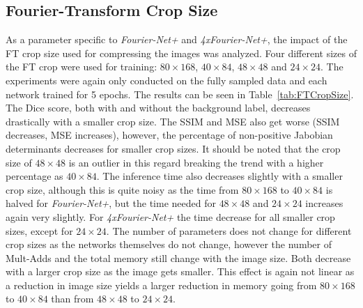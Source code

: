 \subsection{Fourier-Transform Crop Size} \label{SubSec:ResultsFTCropSize}
As a parameter specific to \emph{Fourier-Net+} and \emph{4xFourier-Net+}, the impact of the FT crop size used for compressing the images was analyzed. Four different sizes of the FT crop were used for training: $80 \times 168$, $40 \times 84$, $48 \times 48$ and $24 \times 24$. The experiments were again only conducted on the fully sampled data and each network trained for 5 epochs. The results can be seen in Table~\ref{tab:FTCropSize}. \\
The Dice score, both with and without the background label, decreases drastically with a smaller crop size. The SSIM and MSE also get worse (SSIM decreases, MSE increases), however, the percentage of non-positive Jabobian determinants decreases for smaller crop sizes. It should be noted that the crop size of $48 \times 48$ is an outlier in this regard breaking the trend with a higher percentage as $40 \times 84$. The inference time also decreases slightly with a smaller crop size, although this is quite noisy as the time from $80 \times 168$ to $40 \times 84$ is halved for \emph{Fourier-Net+}, but the time needed for $48 \times 48$ and $24 \times 24$ increases again very slightly. For \emph{4xFourier-Net+} the time decrease for all smaller crop sizes, except for $24 \times 24$. The number of parameters does not change for different crop sizes as the networks themselves do not change, however the number of Mult-Adds and the total memory still change with the image size. Both decrease with a larger crop size as the image gets smaller. This effect is again not linear as a reduction in image size yields a larger reduction in memory going from $80 \times 168$ to $40 \times 84$ than from $48 \times 48$ to $24 \times 24$. 

